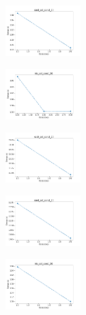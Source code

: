 \begin{figure}[H]
\begin{subfigure}
    \end{subfigure}
    \hfill
    \begin{subfigure}
        \centering
        \includegraphics[width=0.32\textwidth]{img/copkm2/rand_set_const_20_589741062_time.png}
    \end{subfigure}
    \hfill
    \begin{subfigure}
        \centering
        \includegraphics[width=0.32\textwidth]{img/copkm2/iris_set_const_20_277451237_time.png}
    \end{subfigure}
    \hfill
    \begin{subfigure}
        \centering
        \includegraphics[width=0.32\textwidth]{img/copkm2/ecoli_set_const_20_277451237_time.png}
    \end{subfigure}
    \hfill
    \begin{subfigure}
        \centering
        \includegraphics[width=0.32\textwidth]{img/copkm2/rand_set_const_20_277451237_time.png}
    \end{subfigure}
    \hfill
    \begin{subfigure}
        \centering
        \includegraphics[width=0.32\textwidth]{img/copkm2/iris_set_const_20_49258669_time.png}

\end{subfigure}
\end{figure}
